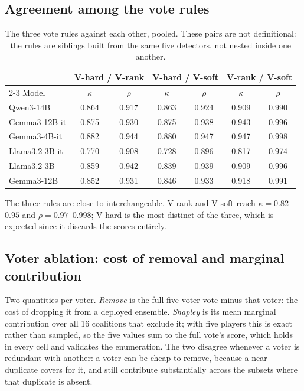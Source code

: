 \subsection{Agreement among the vote rules}

\begin{table}[h]
  \centering
  \caption{The three vote rules against each other, pooled. These pairs are not
  definitional: the rules are siblings built from the same five detectors, not
  nested inside one another.}
  \footnotesize
  \begin{tabular}{l c c c c c c}
    \hline
    & \multicolumn{2}{c}{V-hard / V-rank} & \multicolumn{2}{c}{V-hard / V-soft} & \multicolumn{2}{c}{V-rank / V-soft} \\
    \cline{2-3}\cline{4-5}\cline{6-7}
    Model & $\kappa$ & $\rho$ & $\kappa$ & $\rho$ & $\kappa$ & $\rho$ \\
    \hline
    Qwen3-14B & 0.864 & 0.917 & 0.863 & 0.924 & 0.909 & 0.990 \\
    Gemma3-12B-it & 0.875 & 0.930 & 0.875 & 0.938 & 0.943 & 0.996 \\
    Gemma3-4B-it & 0.882 & 0.944 & 0.880 & 0.947 & 0.947 & 0.998 \\
    Llama3.2-3B-it & 0.770 & 0.908 & 0.728 & 0.896 & 0.817 & 0.974 \\
    Llama3.2-3B & 0.859 & 0.942 & 0.839 & 0.939 & 0.909 & 0.996 \\
    Gemma3-12B & 0.852 & 0.931 & 0.846 & 0.933 & 0.918 & 0.991 \\
    \hline
  \end{tabular}
\end{table}

The three rules are close to interchangeable. V-rank and V-soft reach
$\kappa=0.82$--$0.95$ and $\rho=0.97$--$0.998$; V-hard is the most distinct of the three,
which is expected since it discards the scores entirely.

\subsection{Voter ablation: cost of removal and marginal contribution}

Two quantities per voter. \emph{Remove} is the full five-voter vote minus that
voter: the cost of dropping it from a deployed ensemble. \emph{Shapley} is its mean
marginal contribution over all 16 coalitions that exclude it; with five players this is
exact rather than sampled, so the five values sum to the full vote's score, which holds in
every cell and validates the enumeration. The two disagree whenever a voter is redundant
with another: a voter can be cheap to remove, because a near-duplicate covers for it, and
still contribute substantially across the subsets where that duplicate is absent.

